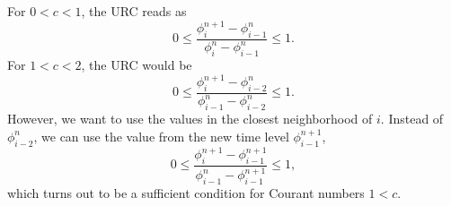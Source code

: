 \documentclass[../thesis.tex]{subfiles}
\begin{document}
For \(0 < c < 1\), the URC reads as
\begin{equation}
    0
    \leq
    \frac{\phi_{i}^{n+1} - \phi_{i-1}^{n}}{\phi_{i}^{n} - \phi_{i-1}^{n}}
    \leq
    1.
\end{equation}
For \(1 < c < 2\), the URC would be
\begin{equation}
    0
    \leq
    \frac{\phi_{i}^{n+1} - \phi_{i-2}^{n}}{\phi_{i-1}^{n} - \phi_{i-2}^{n}}
    \leq
    1.
\end{equation}
However, we want to use the values in the closest neighborhood of \(i\). Instead of \(\phi_{i-2}^{n}\), we can use the value from the new time level \(\phi_{i-1}^{n+1}\),
\begin{equation}\label{eqn: upwind-rage-condition - large c}
    0
    \leq
    \frac{\phi_{i}^{n+1} - \phi_{i-1}^{n+1}}{\phi_{i-1}^{n} - \phi_{i-1}^{n+1}}
    \leq
    1,
\end{equation}
which turns out to be a sufficient condition for Courant numbers \(1 < c\).
\end{document}
